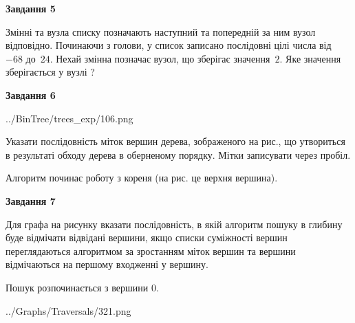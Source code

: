 \documentclass[12pt, ukrainian]{article}
\begin{document}
{\begin {large}
{\begin {center}\textbf{Завдання 5}\end {center}}\par
Змінні  та  вузла списку позначають наступний та попередній за ним вузол відповідно. Починаючи з голови, у список записано послідовні цілі числа від~$-68$ до~$24$. Нехай змінна  позначає вузол, що зберігає значення~$2$.
Яке значення зберігається у вузлі  ?\par
\newpage

{\begin {center}\textbf{Завдання 6}\end {center}}\par

\begin{center}
	{../BinTree/trees_exp/106.png}
\end{center}
Указати послідовність міток вершин дерева, зображеного на рис., що утвориться в результаті обходу дерева в оберненому порядку. Мітки записувати через пробіл.\par Алгоритм починає роботу з кореня (на рис. це верхня вершина).\par
\newpage

{\begin {center}\textbf{Завдання 7}\end {center}}\par
Для графа на рисунку вказати послідовність, в якій алгоритм пошуку в глибину буде відмічати відвідані вершини, якщо списки суміжності вершин переглядаються алгоритмом за зростанням міток вершин та вершини відмічаються на першому вход\-женні у вершину.\par
Пошук розпочинається з вершини 0.\par

\begin{center}
	{../Graphs/Traversals/321.png}
\end{center}\par
\newpage


\end{large}}
\end{document}
